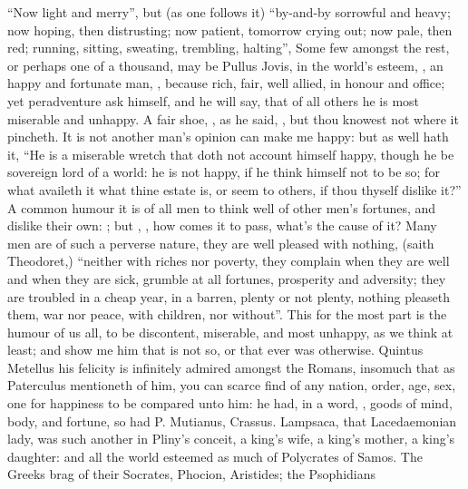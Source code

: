 \enquote{Now light and merry}, but (as one follows it) \enquote{by-and-by
sorrowful and heavy; now hoping, then distrusting; now patient, tomorrow crying
out; now pale, then red; running, sitting, sweating, trembling, halting},
\etc{} Some few amongst the rest, or perhaps one of a thousand, may be Pullus
Jovis, in the world's esteem, , an happy and
fortunate man, , because rich, fair, well allied, in
honour and office; yet peradventure ask himself, and he will say, that of all
others he is most miserable and unhappy. A fair shoe,
, as he said, , but thou knowest not where it pincheth. It is not another man's
opinion can make me happy: but as \Seneca{} well hath it, \enquote{He
is a miserable wretch that doth not account himself happy, though he be
sovereign lord of a world: he is not happy, if he think himself not to be so;
for what availeth it what thine estate is, or seem to others, if thou thyself
dislike it?} A common humour it is of all men to think well of other men's
fortunes, and dislike their own: ; but ,
\etc{}, how comes it to pass, what's the cause of it? Many men are of such a
perverse nature, they are well pleased with nothing, (saith
Theodoret,) \enquote{neither with riches nor poverty, they
complain when they are well and when they are sick, grumble at all fortunes,
prosperity and adversity; they are troubled in a cheap year, in a barren,
plenty or not plenty, nothing pleaseth them, war nor peace, with children, nor
without}. This for the most part is the humour of us all, to be discontent,
miserable, and most unhappy, as we think at least; and show me him that is not
so, or that ever was otherwise. Quintus Metellus his felicity is infinitely
admired amongst the Romans, insomuch that as Paterculus
mentioneth of him, you can scarce find of any nation, order, age, sex, one for
happiness to be compared unto him: he had, in a word, , goods of mind, body, and fortune, so had P. Mutianus,
Crassus. Lampsaca, that Lacedaemonian lady, was such
another in Pliny's conceit, a king's wife, a king's
mother, a king's daughter: and all the world esteemed as much of Polycrates of
Samos. The Greeks brag of their Socrates, Phocion, Aristides; the Psophidians
